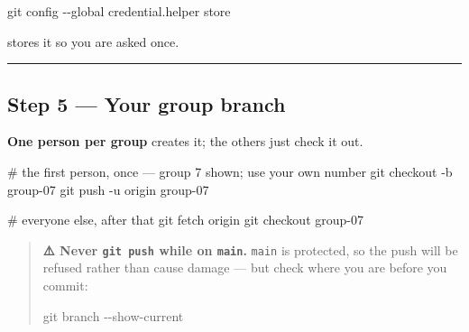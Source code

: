 \documentclass[
  letterpaper,
  10pt,
  twoside,
  openright,
  numbers=noenddot,
  chapterprefix=true]{scrbook}
\newenvironment{Shaded}{}{}
\newcommand{\AttributeTok}[1]{\textcolor[rgb]{0.84,0.23,0.29}{#1}}
\newcommand{\CommentTok}[1]{\textcolor[rgb]{0.42,0.45,0.49}{#1}}
\newcommand{\FunctionTok}[1]{\textcolor[rgb]{0.44,0.26,0.76}{#1}}
\newcommand{\NormalTok}[1]{\textcolor[rgb]{0.14,0.16,0.18}{#1}}
\begin{document}
\begin{Shaded}
\begin{Highlighting}[]
\FunctionTok{git}\NormalTok{ config }\AttributeTok{{-}{-}global}\NormalTok{ credential.helper store}
\end{Highlighting}
\end{Shaded}

stores it so you are asked once.

\begin{center}\rule{0.5\linewidth}{0.5pt}\end{center}

\subsection{Step 5 --- Your group
branch}\label{step-5-your-group-branch}

\textbf{One person per group} creates it; the others just check it out.

\begin{Shaded}
\begin{Highlighting}[]
\CommentTok{\# the first person, once   — group 7 shown; use your own number}
\FunctionTok{git}\NormalTok{ checkout }\AttributeTok{{-}b}\NormalTok{ group{-}07}
\FunctionTok{git}\NormalTok{ push }\AttributeTok{{-}u}\NormalTok{ origin group{-}07}
\end{Highlighting}
\end{Shaded}

\begin{Shaded}
\begin{Highlighting}[]
\CommentTok{\# everyone else, after that}
\FunctionTok{git}\NormalTok{ fetch origin}
\FunctionTok{git}\NormalTok{ checkout group{-}07}
\end{Highlighting}
\end{Shaded}

\begin{quote}
\textbf{⚠️ Never \texttt{git\ push} while on \texttt{main}.}
\texttt{main} is protected, so the push will be refused rather than
cause damage --- but check where you are before you commit:

\begin{Shaded}
\begin{Highlighting}[]
\FunctionTok{git}\NormalTok{ branch }\AttributeTok{{-}{-}show{-}current}
\end{Highlighting}
\end{Shaded}
\end{quote}
\end{document}
